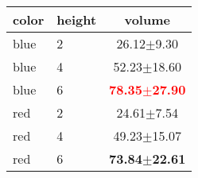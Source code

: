 \begin{tabular}{llc} 
color & height & volume \\ 
\hline 
blue & 2 &  26.12$\pm$9.30 \\ 
blue & 4 & 52.23$\pm$18.60 \\ 
blue & 6 & \textbf{\textcolor{red}{78.35$\pm$27.90}} \\ 
red & 2 &  24.61$\pm$7.54 \\ 
red & 4 & 49.23$\pm$15.07 \\ 
red & 6 & \textbf{73.84$\pm$22.61} \\ 
\end{tabular} 
